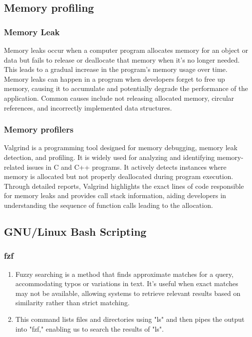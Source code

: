 \documentclass[titlepage]{article}
\begin{document}
\subsection{Memory profiling}
\subsubsection{Memory Leak}
Memory leaks occur when a computer program allocates memory for an object or data but fails to release or deallocate that memory when it's no longer needed. This leads to a gradual increase in the program's memory usage over time. Memory leaks can happen in a program when developers forget to free up memory, causing it to accumulate and potentially degrade the performance of the application. Common causes include not releasing allocated memory, circular references, and incorrectly implemented data structures.
\subsubsection{Memory profilers}
Valgrind is a programming tool designed for memory debugging, memory leak detection, and profiling. It is widely used for analyzing and identifying memory-related issues in C and C++ programs. It actively detects instances where memory is allocated but not properly deallocated during program execution. Through detailed reports, Valgrind highlights the exact lines of code responsible for memory leaks and provides call stack information, aiding developers in understanding the sequence of function calls leading to the allocation.
\subsection{GNU/Linux Bash Scripting}
\subsubsection{fzf}
\begin{enumerate}
    \item Fuzzy searching is a method that finds approximate matches for a query, accommodating typos or variations in text. It's useful when exact matches may not be available, allowing systems to retrieve relevant results based on similarity rather than strict matching.

    \item This command lists files and directories using "ls" and then pipes the output into "fzf," enabling us to search the results of "ls".
\end{enumerate}
\end{document}
